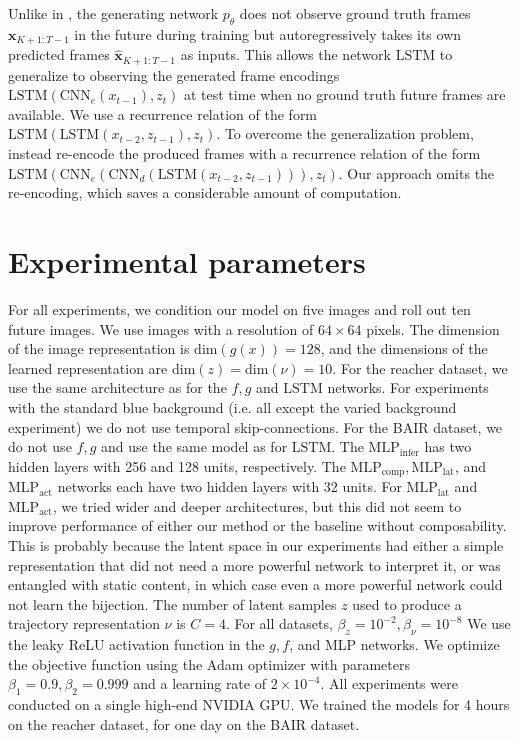 \documentclass{article} %
\begin{document}
Unlike in \cite{denton18stochastic}, the generating network \(p_\theta\) does not observe ground truth frames \(\mathbf{x}_{K+1:T-1}\) in the future during training but autoregressively takes its own predicted frames \(\hat{\mathbf{x}}_{K+1:T-1}\) as inputs. This allows the network \(\text{LSTM}\) to generalize to observing the generated frame encodings \(\text{LSTM}(\text{CNN}_e(x_{t-1}),z_t)\) at test time when no ground truth future frames are available. We use a recurrence relation of the form \(\text{LSTM}(\text{LSTM}(x_{t-2},z_{t-1}),z_t)\). To overcome the generalization problem, \cite{denton18stochastic} instead re-encode the produced frames with a recurrence relation of the form \(\text{LSTM}(\text{CNN}_e(\text{CNN}_d(\text{LSTM}(x_{t-2},z_{t-1}))),z_t)\). Our approach omits the re-encoding, which saves a considerable amount of computation. 

\section{Experimental parameters}\label{app:expp}

For all experiments, we condition our model on five images and roll out ten future images. We use images with a resolution of $64\times 64$ pixels.  The dimension of the image representation is $\text{dim}(g(x)) = 128$, and the dimensions of the learned representation are $\text{dim}(z) = \text{dim}(\nu) = 10$. For the reacher dataset, we use the same architecture as \cite{denton18stochastic} for the $f,g$ and $\text{LSTM}$ networks. For experiments with the standard blue background (i.e. all except the varied background experiment) we do not use temporal skip-connections. For the BAIR dataset, we do not use $f,g$ and use the same model as \cite{lee2018savp} for $\text{LSTM}$. The $\text{MLP}_{\text{infer}}$ has two hidden layers with 256 and 128 units, respectively. The  $\text{MLP}_{\text{comp}},\text{MLP}_{\text{lat}}$, and $\text{MLP}_{\text{act}}$ networks each have two hidden layers with 32 units. For $\text{MLP}_{\text{lat}}$ and $\text{MLP}_{\text{act}}$, we tried wider and deeper architectures, but this did not seem to improve performance of either our method or the baseline without composability. This is probably because the latent space in our experiments had either a simple representation that did not need a more powerful network to interpret it, or was entangled with static content, in which case even a more powerful network could not learn the bijection.  The number of latent samples $z$ used to produce a trajectory representation $\nu$ is $C = 4$. For all datasets, $\beta_z = 10^{-2},\beta_\nu = 10^{-8}$ We use the leaky ReLU activation function in the $g,f$, and MLP networks. We optimize the objective function using the Adam optimizer with parameters $\beta_1=0.9, \beta_2=0.999$ and a learning rate of $2 \times 10^{-4}$. All experiments were conducted on a single high-end NVIDIA GPU. We trained the models for 4 hours on the reacher dataset, for one day on the BAIR dataset.
\end{document}
